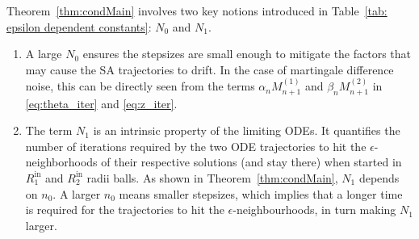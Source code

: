 \documentclass[usenames,dvipsnames,final,12pt]{colt2018} %
\newcommand{\Mt}{M^{(1)}}
\newcommand{\st}{\alpha}
\newcommand{\et}{\epsilon_1}
\newcommand{\Rti}{R_1^{\textrm{in}}}
\newcommand{\thS}{\theta^*}
\newcommand{\Mw}{M^{(2)}}
\newcommand{\sw}{\beta}
\newcommand{\ez}{\epsilon_2}
\newcommand{\Rzi}{R_2^{\textrm{in}}}
\newcommand{\zS}{z^*}
\newcommand{\gal}[1]{#1}
\newcommand{\gugan}[1]{#1}
\begin{document}
\begin{remark} \label{remark: main thm remark}
{Theorem~\ref{thm:condMain}}
\gugan{involves} two key notions \gugan{introduced} in Table~\ref{tab: epsilon dependent constants}: $N_0$ and $N_1$.
\begin{enumerate}
%
\item A large $N_0$ ensures the stepsizes are small enough to mitigate the factors that may cause the SA trajectories to drift. In the case of martingale \gugan{difference} noise, this can be directly seen from the terms $\st_n \Mt_{n+1}$ and $\sw_n \Mw_{n+1}$ in \eqref{eq:theta_iter} and \eqref{eq:z_iter}. %



\item The term $N_1$ is an intrinsic property of the limiting ODEs. It quantifies the number of iterations required by the two ODE trajectories to hit the $\epsilon$-neighborhoods of their respective solutions (and \gugan{stay} there) when started \gugan{in $\Rti$ and $\Rzi$ radii balls}. As shown in \gal{Theorem~\ref{thm:condMain}}, $N_1$ depends on \gugan{$n_0.$} A larger \gugan{$n_0$} means smaller stepsizes, which implies that a longer time is required for the trajectories to hit the $\epsilon$-neighbourhoods, in turn making $N_1$ larger.

\end{enumerate}
\end{remark}

\end{document}
